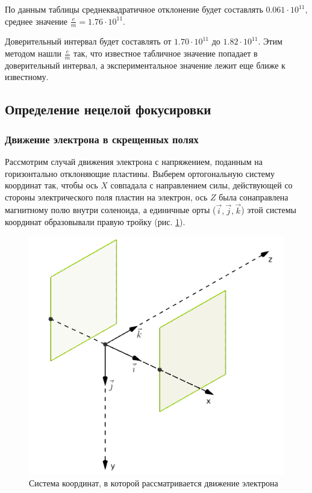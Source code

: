 По данным таблицы среднеквадратичное отклонение будет составлять $0.061\cdot10^{11}$, среднее значение $\frac{e}{m}=1.76\cdot10^{11}$.

Доверительный интервал будет составлять от $1.70\cdot10^{11}$ до $1.82\cdot10^{11}$. Этим методом нашли $\frac{e}{m}$ так, что известное табличное значение попадает в доверительный интервал, а экспериментальное значение лежит еще ближе к известному.

\newpage
\subsection{Определение нецелой фокусировки}

\subsubsection{Движение электрона в скрещенных полях}

Рассмотрим случай движения электрона с напряжением, поданным на горизонтально отклоняющие пластины. Выберем ортогональную систему координат так, чтобы ось $X$ совпадала с направлением силы, действующей со стороны электрического поля пластин на электрон, ось $Z$ была сонаправлена магнитному полю внутри соленоида, а единичные орты ($\vec{i},\vec{j},\vec{k}$) этой системы координат образовывали правую тройку (рис. \ref{fig:axes}).

\begin{figure}[h!]
	\centering
	\includegraphics[scale=0.5]{img/axes.png}
	\caption{Система координат, в которой рассматривается движение электрона}
	\label{fig:axes}
\end{figure}


